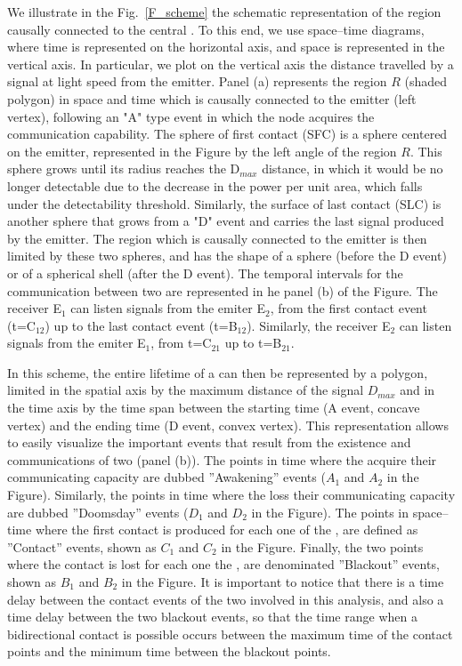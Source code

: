 We illustrate in the Fig.~\ref{F_scheme} the schematic representation
of the region causally connected to the central \ceti{}.
%
To this end, we use space--time diagrams, where time is represented on
the horizontal axis, and space is represented in the vertical axis.
%
In particular, we plot on the vertical axis the distance travelled by
a signal at light speed from the emitter.
%
Panel (a) represents the region $R$ (shaded polygon) 
in space and time which is causally
connected to the emitter (left vertex), following an "A" type event
in which the node acquires the communication capability.
%
The sphere of first contact (SFC) is a sphere centered on the emitter,
represented in the Figure by the left angle of the region $R$.
%
This sphere grows until its radius reaches the D$_{max}$ distance, in which
it would be no longer detectable due to the decrease in the power per
unit area, which falls under the detectability threshold.
%
Similarly, the surface of last contact (SLC) is another sphere that 
grows from a
"D" event and carries the last signal produced by the
emitter.
%
The region which is causally connected to the emitter is then limited
by these two spheres, and has the shape of a sphere (before the D
event) or of a spherical shell (after the D event).
%
The temporal intervals for
the communication between two \cetis{} are represented in he
panel (b) of the Figure.
%
The receiver \ceti{} E$_1$ can listen signals from the emiter \ceti{} E$_2$,
from the first contact event (t=C$_{12}$) up to the last contact event (t=B$_{12}$).
%
Similarly, 
the receiver \ceti{} E$_2$ can listen signals from the emiter \ceti{} E$_1$,
from t=C$_{21}$ up to t=B$_{21}$.




In this scheme, the entire lifetime of a \ceti{} can then be represented
by a polygon, limited in the spatial axis by the maximum distance of
the signal $D_{max}$ and in the time axis by the time span between the
starting time (A event, concave vertex) and the ending time (D event, 
convex vertex).
%
This representation allows to easily visualize the important events
that result from the existence and communications of two \cetis{} (panel
(b)).
%
The points in time where the \cetis{} acquire their communicating capacity
are dubbed ''Awakening'' events ($A_1$ and $A_2$ in the Figure).
%
Similarly, the points in time where the \cetis{} loss their
communicating capacity are dubbed ''Doomsday'' events ($D_1$ and $D_2$
in the Figure).
%
The points in space--time where the first contact is produced for each
one of the \cetis{}, are defined as ''Contact'' events, shown as $C_1$
and $C_2$ in the Figure.
%
Finally, the two points where the contact is lost for each one the
\cetis{}, are denominated ''Blackout'' events, shown as $B_1$ and $B_2$
in the Figure.
%
It is important to notice that there is a time delay between the
contact events of the two \cetis{} involved in this analysis, and also a
time delay between the two blackout events, so that the time range
when a bidirectional contact is possible occurs between the maximum
time of the contact points and the minimum time between the blackout
points.   
 
